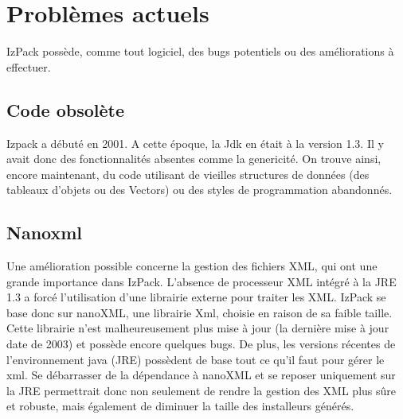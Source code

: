 \section{Problèmes actuels}
IzPack possède, comme tout logiciel, des bugs potentiels ou des améliorations à effectuer.
\subsection{Code obsolète}
Izpack a débuté en 2001. 
A cette époque, la Jdk en était à la version 1.3. Il y avait donc des fonctionnalités absentes comme la genericité. 
On trouve ainsi, encore maintenant, du code utilisant de vieilles structures de données (des tableaux d'objets ou des Vectors) ou des styles de programmation abandonnés.
\subsection{Nanoxml}
Une amélioration possible concerne la gestion des fichiers XML, qui ont une grande importance dans IzPack.
L'absence de processeur XML intégré à la JRE 1.3 a forcé l'utilisation d'une librairie externe pour traiter les XML.
IzPack se base donc sur nanoXML, une librairie Xml, choisie en raison de sa faible taille.
Cette librairie n'est malheureusement plus mise à jour (la dernière mise à jour date de 2003) et possède encore quelques bugs.
De plus, les versions récentes de l'environnement java (JRE) possèdent de base tout ce qu'il faut pour gérer le xml.
Se débarrasser de la dépendance à nanoXML et se reposer uniquement sur la JRE permettrait donc non seulement de rendre la gestion des XML plus sûre et robuste, mais également de diminuer la taille des installeurs générés.
